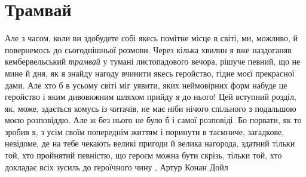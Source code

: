  
 
 
 
 
\chapter{Трамвай}

Але з часом, коли ви здобудете собі якесь помітне місце в світі, ми, можливо, й
повернемось до сьогоднішньої розмови.  Через кілька хвилин я вже наздоганяв
кембервельський \emph{трамвай} у тумані листопадового вечора, рішуче певний, що не
мине й дня, як я знайду нагоду вчинити якесь геройство, гідне моєї прекрасної
дами. Але хто б в усьому світі міг уявити, яких неймовірних форм набуде це
геройство і яким дивовижним шляхом прийду я до нього!  Цей вступний розділ, як,
може, здається комусь із читачів, не має ніби нічого спільного з подальшою моєю
розповіддю. Але ж без нього не було б і самої розповіді. Бо порвати, як то
зробив я, з усім своїм попереднім життям і поринути в таємниче, загадкове,
невідоме, де на тебе чекають великі пригоди й велика нагорода, здатний тільки
той, хто пройнятий певністю, що героєм можна бути скрізь, тільки той, хто
докладає всіх зусиль до героїчного чину
, Артур Конан Дойл
